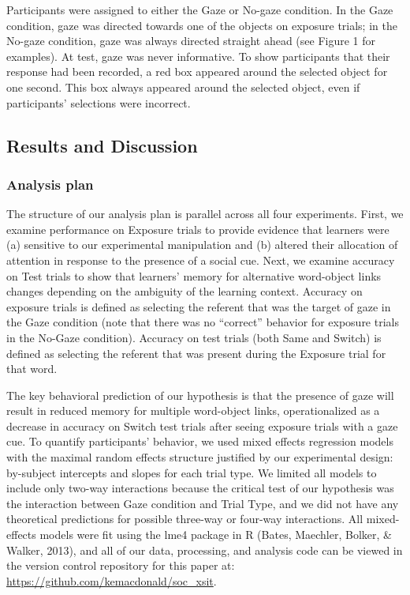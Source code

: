 \documentclass[authoryear, review]{elsarticle}
\begin{document}
Participants were assigned to either the Gaze or No-gaze condition. In
the Gaze condition, gaze was directed towards one of the objects on
exposure trials; in the No-gaze condition, gaze was always directed
straight ahead (see Figure 1 for examples). At test, gaze was never
informative. To show participants that their response had been recorded,
a red box appeared around the selected object for one second. This box
always appeared around the selected object, even if participants'
selections were incorrect.

\subsection{Results and Discussion}\label{results-and-discussion}

\subsubsection{Analysis plan}\label{analysis-plan}

The structure of our analysis plan is parallel across all four
experiments. First, we examine performance on Exposure trials to provide
evidence that learners were (a) sensitive to our experimental
manipulation and (b) altered their allocation of attention in response
to the presence of a social cue. Next, we examine accuracy on Test
trials to show that learners' memory for alternative word-object links
changes depending on the ambiguity of the learning context. Accuracy on
exposure trials is defined as selecting the referent that was the target
of gaze in the Gaze condition (note that there was no ``correct''
behavior for exposure trials in the No-Gaze condition). Accuracy on test
trials (both Same and Switch) is defined as selecting the referent that
was present during the Exposure trial for that word.

The key behavioral prediction of our hypothesis is that the presence of
gaze will result in reduced memory for multiple word-object links,
operationalized as a decrease in accuracy on Switch test trials after
seeing exposure trials with a gaze cue. To quantify participants'
behavior, we used mixed effects regression models with the maximal
random effects structure justified by our experimental design:
by-subject intercepts and slopes for each trial type. We limited all
models to include only two-way interactions because the critical test of
our hypothesis was the interaction between Gaze condition and Trial
Type, and we did not have any theoretical predictions for possible
three-way or four-way interactions. All mixed-effects models were fit
using the lme4 package in R (Bates, Maechler, Bolker, \& Walker, 2013),
and all of our data, processing, and analysis code can be viewed in the
version control repository for this paper at:
\url{https://github.com/kemacdonald/soc_xsit}.
\end{document}

